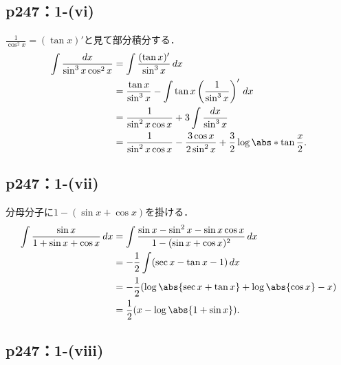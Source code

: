 \subsection*{p247：1-(vi)}


\begin{tanswer}
    $\frac{1}{\cos^2 x} = (\tan x)'$と見て部分積分する．
    \begin{align*}
        \int \frac{dx}{\sin^3 x \cos^2 x}
         & = \int \frac{(\tan x)'}{\sin^3 x} \,dx                                                                \\
         & = \frac{\tan x}{\sin^3 x} - \int \tan x \left(\frac{1}{\sin^3 x}\right)' \,dx                         \\
         & = \frac{1}{\sin^2 x \cos x} + 3 \int \frac{dx}{\sin^3 x}                                              \\
         & = \frac{1}{\sin^2 x \cos x} - \frac{3 \cos x}{2 \sin^2 x} + \frac{3}{2} \log \abs*{\tan \frac{x}{2}}.
    \end{align*}
\end{tanswer}


\subsection*{p247：1-(vii)}

\begin{tanswer}
    分母分子に$1-(\sin x + \cos x)$を掛ける．
    \begin{align*}
        \int \frac{\sin x}{1 + \sin x + \cos x} \,dx
         & = \int \frac{\sin x - \sin^2 x - \sin x\cos x}{1-(\sin x + \cos x)^2} \,dx \\
         & = -\frac{1}{2} \int (\sec x - \tan x - 1) \,dx                             \\
         & = -\frac{1}{2}(\log \abs{\sec x + \tan x} + \log \abs{\cos x} - x)         \\
         & = \frac{1}{2}(x - \log \abs{1 + \sin x}).
    \end{align*}
\end{tanswer}

\subsection*{p247：1-(viii)}



